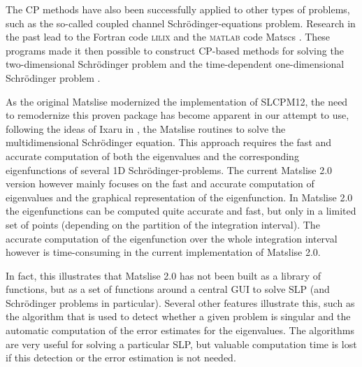 The CP methods have also been successfully applied to other types of problems, such as the so-called coupled channel Schrödinger-equations problem. Research in the past lead to the Fortran code \textsc{lilix} \cite{ixaru_lilix_2002} and the \textsc{matlab} code Matscs \cite{ledoux_numerical_2007}. These programs made it then possible to construct CP-based methods for solving the two-dimensional Schrödinger problem \cite{ixaru_new_2010} and the time-dependent one-dimensional Schrödinger problem \cite{ledoux_accurate_2014}.


As the original Matslise modernized the implementation of SLCPM12, the need to remodernize this proven package has become apparent in our attempt to use, following the ideas of Ixaru in \cite{ixaru_new_2010}, the Matslise routines to solve the multidimensional Schrödinger equation.
This approach requires the fast and accurate computation of both the eigenvalues and the corresponding eigenfunctions of several 1D Schrödinger-problems.
The current Matslise 2.0 version however mainly focuses on the fast and accurate computation of eigenvalues and the graphical representation of the eigenfunction.
In Matslise 2.0 the eigenfunctions can be computed quite accurate and fast, but only in a limited set of points (depending on the partition of the integration interval).
The accurate computation of the eigenfunction over the whole integration interval however is time-consuming in the current implementation of Matslise 2.0.

In fact, this illustrates that Matslise 2.0 has not been built as a library of functions, but as a set of functions around a central GUI to solve SLP (and Schrödinger problems in particular).
Several other features illustrate this, such as the algorithm that is used to detect whether a given problem is singular and the automatic computation of the error estimates for the eigenvalues.
The algorithms are very useful for solving a particular SLP, but valuable computation time is lost if this detection or the error estimation is not needed.


%

